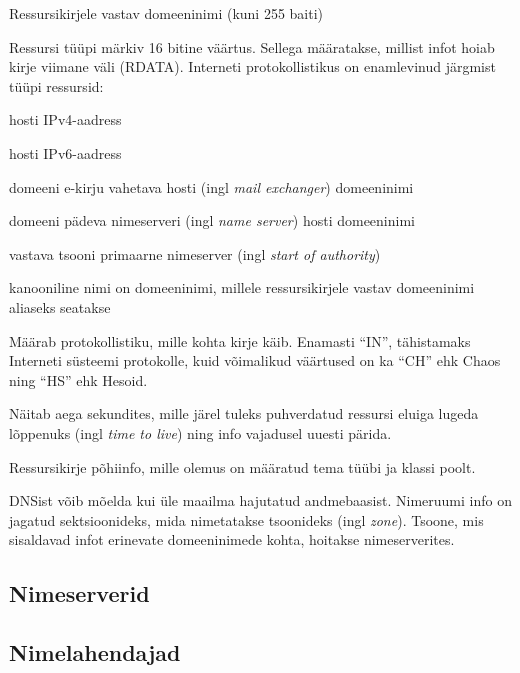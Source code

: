 \documentclass[../main.tex]{subfiles}
\begin{document}
\renewcommand{\descriptionlabel}[1]{\hspace{\labelsep}\texttt{#1}}
\begin{description}[style=multiline,leftmargin=1.5cm]
  \item[OWNER] Ressursikirjele vastav domeeninimi (kuni 255 baiti)
  \item[TYPE] Ressursi tüüpi märkiv 16 bitine väärtus. Sellega määratakse, millist infot hoiab kirje viimane väli (RDATA). Interneti protokollistikus on enamlevinud järgmist tüüpi ressursid:
    \begin{description}[style=multiline,leftmargin=1.25cm,nosep]
      \item[A] hosti IPv4-aadress
      \item[AAAA] hosti IPv6-aadress
      \item[MX] domeeni e-kirju vahetava hosti (ingl \textit{mail exchanger}) domeeninimi
      \item[NS] domeeni pädeva nimeserveri (ingl \textit{name server}) hosti domeeninimi
      \item[SOA] vastava tsooni primaarne nimeserver (ingl \textit{start of authority})
      \item[CNAME] kanooniline nimi on domeeninimi, millele ressursikirjele vastav domeeninimi aliaseks seatakse
    \end{description}
  \item[CLASS] Määrab protokollistiku, mille kohta kirje käib. Enamasti \enquote{IN}, tähistamaks Interneti süsteemi protokolle, kuid võimalikud väärtused on ka \enquote{CH} ehk Chaos ning \enquote{HS} ehk Hesoid.
  \item[TTL] Näitab aega sekundites, mille järel tuleks puhverdatud ressursi eluiga lugeda lõppenuks (ingl \textit{time to live}) ning info vajadusel uuesti pärida.
  \item[RDATA] Ressursikirje põhiinfo, mille olemus on määratud tema tüübi ja klassi poolt.
\end{description}

DNSist võib mõelda kui üle maailma hajutatud andmebaasist.
Nimeruumi info on jagatud sektsioonideks, mida nimetatakse tsoonideks (ingl \textit{zone}).
Tsoone, mis sisaldavad infot erinevate domeeninimede kohta, hoitakse nimeserverites.


\subsection{Nimeserverid}

\subsection{Nimelahendajad}
\end{document}
